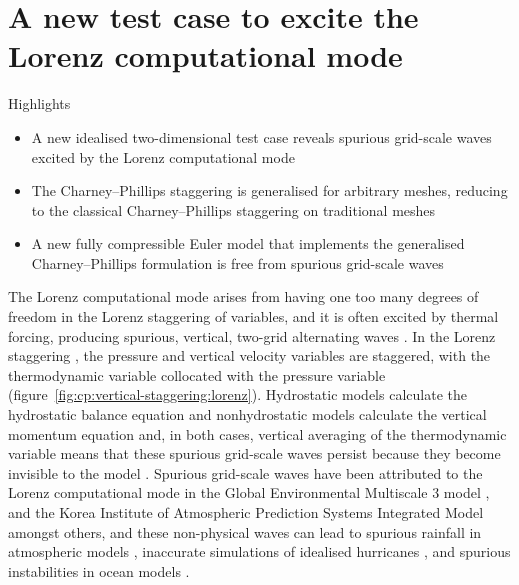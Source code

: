 \chapter{A new test case to excite the Lorenz computational mode}
\label{ch:cp}

\begin{highlights}
{\Large Highlights}
\begin{itemize}
	\item A new idealised two-dimensional test case reveals spurious grid-scale waves excited by the Lorenz computational mode
	\item The Charney--Phillips staggering is generalised for arbitrary meshes, reducing to the classical Charney--Phillips staggering on traditional meshes
	\item A new fully compressible Euler model that implements the generalised Charney--Phillips formulation is free from spurious grid-scale waves
\end{itemize}
\end{highlights}

The Lorenz computational mode arises from having one too many degrees of freedom in the Lorenz staggering of variables, and it is often excited by thermal forcing, producing spurious, vertical, two-grid alternating waves \citep{schneider1987,arakawa-konor1996}.
In the Lorenz staggering \citep{lorenz1960}, the pressure and vertical velocity variables are staggered, with the thermodynamic variable collocated with the pressure variable (figure~\ref{fig:cp:vertical-staggering:lorenz}).
Hydrostatic models calculate the hydrostatic balance equation and nonhydrostatic models calculate the vertical momentum equation and, in both cases, vertical averaging of the thermodynamic variable means that these spurious grid-scale waves persist because they become invisible to the model \citep{arakawa-konor1996}.
Spurious grid-scale waves have been attributed to the Lorenz computational mode in the Global Environmental Multiscale 3 model \citep{girard2014}, and the Korea Institute of Atmospheric Prediction Systems Integrated Model \citep{yi-park2017} amongst others, and these non-physical waves can lead to spurious rainfall in atmospheric models \citep{hollingsworth1995}, inaccurate simulations of idealised hurricanes \citep{zhu-smith2003}, and spurious instabilities in ocean models \citep{bell-white2017}.


